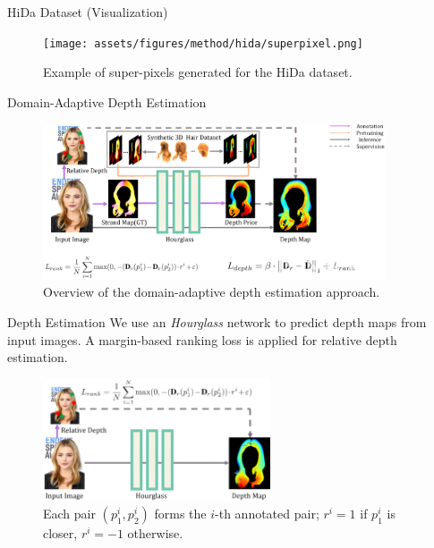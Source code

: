 \begin{frame}[t]{HiDa Dataset (Visualization)}
    \begin{figure}[t]
        \centering
        \texttt{[image: assets/figures/method/hida/superpixel.png]}
        \caption{Example of super-pixels generated for the HiDa dataset.}
        \label{fig:hida-superpixel}
    \end{figure}
\end{frame}

\begin{frame}{Domain-Adaptive Depth Estimation}
    \begin{figure}[t]
        \centering
        \includegraphics[width=0.9\textwidth]{assets/figures/method/depth/pipeline.png}
        \caption{Overview of the domain-adaptive depth estimation approach.}
        \label{fig:depth_estimation_overview}
    \end{figure}
\end{frame}

\begin{frame}{Depth Estimation}
    We use an \emph{Hourglass} network to predict depth maps from input images. 
    A margin-based ranking loss is applied for relative depth estimation.
    \begin{figure}[t]
        \centering
        \includegraphics[width=0.6\textwidth]{assets/figures/method/depth/hourglass.png}
        \caption{Each pair $(p^i_1, p^i_2)$ forms the $i$-th annotated pair; $r^i=1$ if $p^i_1$ is closer, $r^i=-1$ otherwise.}
        \label{fig:hourglass_depth}
    \end{figure}
\end{frame}

